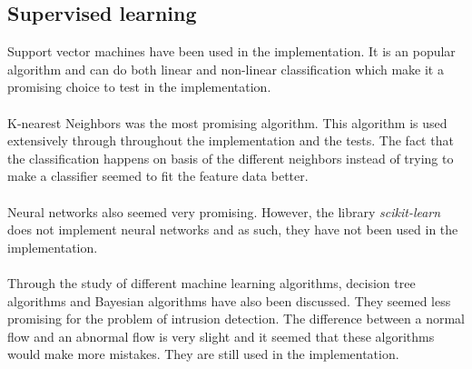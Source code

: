 \subsection{Supervised learning}
Support vector machines have been used in the implementation. It is an popular algorithm and can do both linear and non-linear classification which make it a promising choice to test in the implementation. \\
\\
K-nearest Neighbors was the most promising algorithm. This algorithm is used extensively through throughout the implementation and the tests. The fact that the classification happens on basis of the different neighbors instead of trying to make a classifier seemed to fit the feature data better. \\
\\
Neural networks also seemed very promising. However, the library \textit{scikit-learn} does not implement neural networks and as such, they have not been used in the implementation. \\
\\
Through the study of different machine learning algorithms, decision tree algorithms and Bayesian algorithms have also been discussed. They seemed less promising for the problem of intrusion detection. The difference between a normal flow and an abnormal flow is very slight and it seemed that these algorithms would make more mistakes. They are still used in the implementation.
